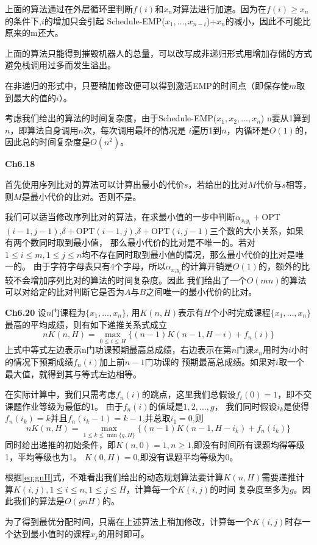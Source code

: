 \documentclass{article}
\begin{document}
上面的算法通过在外层循环里判断$f(i)$和$x_n$对算法进行加速。因为在$f(i)\geq x_n$的条件下,$i$的增加只会引起
Schedule-EMP($x_1,\dots,x_{n-i}$)+$x_n$的减小，因此不可能比原来的m还大。

上面的算法只能得到摧毁机器人的总量，可以改写成非递归形式用增加存储的方式避免栈调用过多而发生溢出。

在非递归的形式中，只要稍加修改便可以得到激活EMP的时间点（即保存使$m$取到最大的值的$i$）。

考虑我们给出的算法的时间复杂度，由于Schedule-EMP($x_1,x_2,\dots,x_n$) n要从1算到$n$，即算法自身调用$n$次，每次调用最坏的情况是
$i$遍历1到$n$，内循环是$O(1)$的，因此总的时间复杂度是$O(n^2)$。

\textbf{Ch6.18}

首先使用序列比对的算法可以计算出最小的代价$s$，若给出的比对$M$代价与$s$相等，则$M$是最小代价的比对。否则不是。

我们可以适当修改序列比对的算法，在求最小值的一步中判断$\alpha_{x_iy_i}+$OPT$(i-1,j-1)$,$\delta+$OPT$(i-1,j)$,$\delta+$OPT$(i,j-1)$三个数的大小关系，如果有两个数同时取到最小值，
那么最小代价的比对是不唯一的。若对$1\leq i\leq m,1\leq j\leq n$均不存在同时取到最小值的情况，那么最小代价的比对是唯一的。
由于字符字母表只有4个字母，所以$\alpha_{x_iy_i}$的计算开销是$O(1)$的，额外的比较不会增加序列比对的算法的时间复杂度。因此
我们给出了一个$O(mn)$的算法可以对给定的比对判断它是否为$A$与$B$之间唯一的最小代价的比对。

\textbf{Ch6.20}
设$n$门课程为$\{x_1,\dots,x_n\}$,
用$K(n,H)$表示有$H$个小时完成课程$\{x_1,\dots,x_n\}$最高的平均成绩，则有如下递推关系式成立
\begin{equation}
nK(n,H)=\max_{0\leq i\leq H}\{(n-1)K(n-1,H-i)+f_n(i)\}
\end{equation}
上式中等式左边表示n门功课预期最高总成绩，右边表示在第$n$门课$x_n$用时为$i$小时的情况下预期成绩$f_n(i)$加上前$n-1$门功课的
预期最高总成绩。如果对$i$取一个最大值，就得到其与等式左边相等。

在实际计算中，我们只需考虑$f_n(i)$的跳点，这里我们总假设$f_t(0)=1$，即不交课题作业等级为最低的1。
由于$f_n(i)$的值域是$1,2,\dots,g$，
我们同时假设$i_k$是使得$f_n(i_k)=k$并且$f_n(i_k-1)=k-1$,并总取$i_1=0$,则
\begin{equation}\label{eq:gnH}
nK(n,H)=\max_{1\leq k\leq \min\{g,H\}}\{(n-1)K(n-1,H-i_k)+f_n(i_k)\}
\end{equation}
同时给出递推的初始条件，即$K(n,0)=1,n\geq 1$,即没有时间所有课题均得等级1，平均等级也为1。
$K(0,H)=0$,即没有课题平均等级为0。

根据\eqref{eq:gnH}式，不难看出我们给出的动态规划算法要计算$K(n,H)$需要递推计算$K(i,j),1\leq i\leq n,1\leq j\leq H$，计算每一个$K(i,j)$的时间
复杂度至多为$g$。因此我们的算法是$O(gnH)$的。

为了得到最优分配时间，只需在上述算法上稍加修改，计算每一个$K(i,j)$时存一个达到最小值时的课程$x_j$的用时即可。
\end{document}
